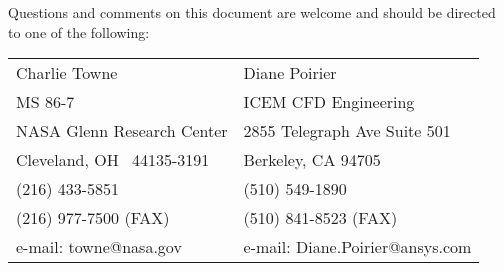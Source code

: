 Questions and comments on this document are welcome and should be
directed to one of the following:
\begin{center}
\begin{tabular}{l@{\qquad\qquad}l}
Charlie Towne               & Diane Poirier \\
MS 86-7                     & ICEM CFD Engineering \\
NASA Glenn Research Center  & 2855 Telegraph Ave Suite 501 \\
Cleveland, OH \ 44135-3191  & Berkeley, CA  94705 \\
(216) 433-5851              & (510) 549-1890 \\
(216) 977-7500 (FAX)        & (510) 841-8523 (FAX) \\
e-mail: towne@nasa.gov      & e-mail: Diane.Poirier@ansys.com
\end{tabular}
\end{center}

